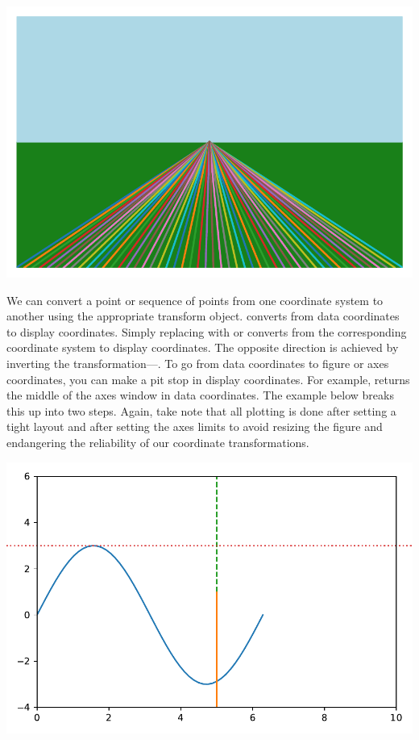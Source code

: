 \begin{center}
    \includegraphics[width = .7\textwidth]{figures/proseplots/coord-horizon.pdf}
\end{center}


We can convert a point or sequence of points from one coordinate system to another using the appropriate transform object.  converts  from data coordinates to display coordinates. Simply replacing  with  or  converts from the corresponding coordinate system to display coordinates. The opposite direction is achieved by inverting the transformation---. To go from data coordinates to figure or axes coordinates, you can make a pit stop in display coordinates. For example,   returns the middle of the axes window in data coordinates. The example below breaks this up into two steps. Again, take note that all plotting is done after setting a tight layout and after setting the axes limits to avoid resizing the figure and endangering the reliability of our coordinate transformations. 



\begin{center}
    \includegraphics[width = .7\textwidth]{figures/proseplots/coord-trans.pdf}
\end{center}



